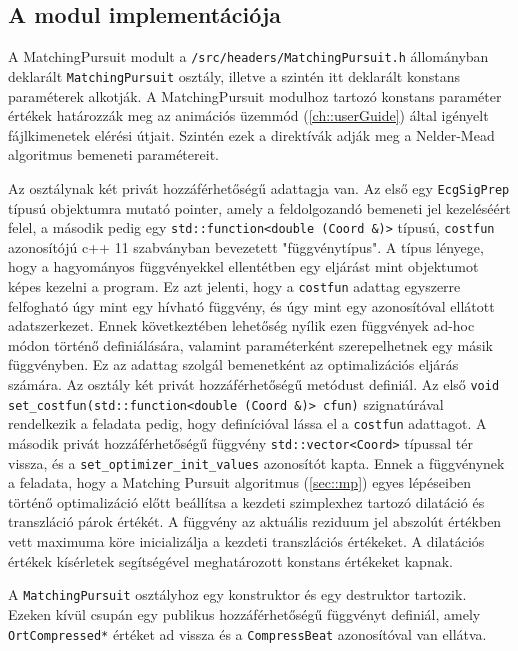 \documentclass[oneside,titlepage,12pt,a4paper]{report}
\begin{document}
\subsection*{A modul implementációja}

\par A MatchingPursuit modult a \texttt{/src/headers/MatchingPursuit.h} állományban deklarált \texttt{MatchingPursuit} osztály, illetve a szintén itt deklarált konstans paraméterek alkotják. A MatchingPursuit modulhoz tartozó konstans paraméter értékek határozzák meg az animációs üzemmód (\ref{ch::userGuide}) által igényelt fájlkimenetek elérési útjait. Szintén ezek a direktívák adják meg a Nelder-Mead algoritmus bemeneti paramétereit. 
\par Az osztálynak két privát hozzáférhetőségű adattagja van. Az első egy \texttt{EcgSigPrep} típusú objektumra mutató pointer, amely a feldolgozandó bemeneti jel kezeléséért felel, a második pedig egy \texttt{std::function<double (Coord \&)>} típusú, \texttt{costfun} azonosítójú c++ 11 szabványban bevezetett "függvénytípus". A típus lényege, hogy a hagyományos függvényekkel ellentétben egy eljárást mint objektumot képes kezelni a program. Ez azt jelenti, hogy a \texttt{costfun} adattag egyszerre felfogható úgy mint egy hívható függvény, és úgy mint egy azonosítóval ellátott adatszerkezet. Ennek következtében lehetőség nyílik ezen függvények ad-hoc módon történő definiálására, valamint paraméterként szerepelhetnek egy másik függvényben. Ez az adattag szolgál bemenetként az optimalizációs eljárás számára. Az osztály két privát hozzáférhetőségű metódust definiál. Az első \texttt{void set\_costfun(std::function<double (Coord \&)> cfun)} szignatúrával rendelkezik a feladata pedig, hogy definícióval lássa el a \texttt{costfun} adattagot. A második privát hozzáférhetőségű függvény \texttt{std::vector<Coord>} típussal tér vissza, és a \texttt{set\_optimizer\_init\_values} azonosítót kapta. Ennek a függvénynek a feladata, hogy a Matching Pursuit algoritmus (\ref{sec::mp}) egyes lépéseiben történő optimalizáció előtt beállítsa a kezdeti szimplexhez tartozó dilatáció és transzláció párok értékét. A függvény az aktuális reziduum jel abszolút értékben vett maximuma köre inicializálja a kezdeti transzlációs értékeket. A dilatációs értékek kísérletek segítségével meghatározott konstans értékeket kapnak.  
\par A \texttt{MatchingPursuit} osztályhoz egy konstruktor és egy destruktor tartozik. Ezeken kívül csupán egy publikus hozzáférhetőségű függvényt definiál, amely \texttt{OrtCompressed*} értéket ad vissza és a \texttt{CompressBeat} azonosítóval van ellátva. 
\end{document}
